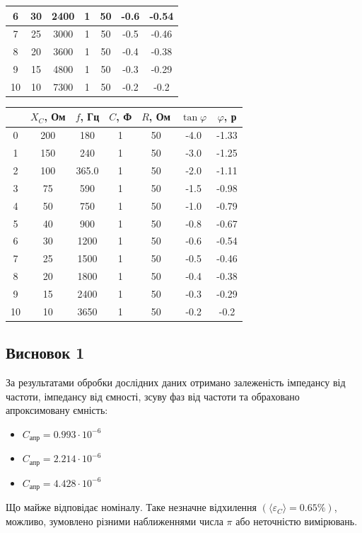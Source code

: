\documentclass[a4paper,12pt]{article}
\begin{document}
\begin{justify}
\begin{table}[htp]
\begin{tabular}{|c|c|c|c|c|c|c|}
6  & 30    & 2400 & 1   & 50  & -0.6          & -0.54     \\ \hline
7  & 25    & 3000 & 1   & 50  & -0.5          & -0.46     \\ \hline
8  & 20    & 3600 & 1   & 50  & -0.4          & -0.38     \\ \hline
9  & 15    & 4800 & 1   & 50  & -0.3          & -0.29     \\ \hline
10 & 10    & 7300 & 1   & 50  & -0.2          & -0.2      \\ \hline
\end{tabular}
\end{table}
\begin{table}[htp]
\centering
\begin{tabular}{|c|c|c|c|c|c|c|}
\hline
   & $X_C$, Ом& $f$, Гц & $C$, Ф& $R$, Ом& $\tan\varphi$ & $\varphi$, р\\ \hline
0  & 200   & 180   & 1   & 50  & -4.0          & -1.33     \\ \hline
1  & 150   & 240   & 1   & 50  & -3.0          & -1.25     \\ \hline
2  & 100   & 365.0 & 1   & 50  & -2.0          & -1.11     \\ \hline
3  & 75    & 590   & 1   & 50  & -1.5          & -0.98     \\ \hline
4  & 50    & 750   & 1   & 50  & -1.0          & -0.79     \\ \hline
5  & 40    & 900   & 1   & 50  & -0.8          & -0.67     \\ \hline
6  & 30    & 1200  & 1   & 50  & -0.6          & -0.54     \\ \hline
7  & 25    & 1500  & 1   & 50  & -0.5          & -0.46     \\ \hline
8  & 20    & 1800  & 1   & 50  & -0.4          & -0.38     \\ \hline
9  & 15    & 2400  & 1   & 50  & -0.3          & -0.29     \\ \hline
10 & 10    & 3650  & 1   & 50  & -0.2          & -0.2      \\ \hline
\end{tabular}
\end{table}\newpage
\subsection*{Висновок 1}
За результатами обробки дослідних даних отримано залеженість імпедансу від частоти, імпедансу від ємності, зсуву фаз від частоти та обраховано апроксимовану ємність:
\begin{itemize}
		\item $C_{\textrm{апр}}=0.993\cdot10^{-6}$
		\item $C_{\textrm{апр}}=2.214\cdot10^{-6}$
		\item $C_{\textrm{апр}}=4.428\cdot10^{-6}$
	\end{itemize}
Що майже відповідає номіналу. Таке незначне відхилення $(\langle\varepsilon_C\rangle=0.65\%)$, можливо, зумовлено різними наближеннями числа $\pi$ або неточністю вимірювань. 


\end{justify}
\end{document}
